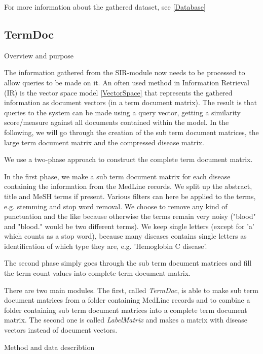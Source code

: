 For more information about the gathered dataset, see \ref{Database}

\subsection{TermDoc\label{TermDoc}}

Overview and purpose

The information gathered from the SIR-module now needs to be processed
to allow queries to be made on it. An often used method in Information
Retrieval (IR) is the vector space model \ref{VectorSpace} that
represents the gathered information as document vectors (in a term
document matrix). The result is that queries to the system can be made
using a query vector, getting a similarity score/measure against all
documents contained within the model. In the following, we will go
through the creation of the sub term document matrices, the large term
document matrix and the compressed disease matrix.

We use a two-phase approach to construct the complete term document
matrix.

In the first phase, we make a sub term document matrix for each
disease containing the information from the MedLine records. We split
up the abstract, title and MeSH terms if present. Various filters can
here be applied to the terms, e.g. stemming and stop word removal. We
choose to remove any kind of punctuation and the like because
otherwise the terms remain very noisy ("blood" and "blood." would be
two different terms). We keep single letters (except for 'a' which
counts as a stop word), because many diseases contains single letters
as identification of which type they are, e.g. 'Hemoglobin C disease'.

The second phase simply goes through the sub term document matrices
and fill the term count values into complete term document matrix.

There are two main modules. The first, called \textit{TermDoc}, is
able to make sub term document matrices from a folder containing
MedLine records and to combine a folder containing sub term document
matrices into a complete term document matrix. The second one is
called \textit{LabelMatrix} and makes a matrix with disease vectors
instead of document vectors.

Method and data describtion


